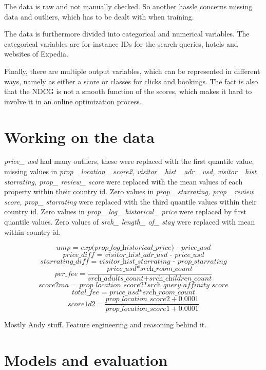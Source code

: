 \documentclass{llncs}
\begin{document}
The data is raw and not manually checked. So another hassle concerns missing data and outliers, which has to be dealt with when training. 

The data is furthermore divided into categorical and numerical variables. The categorical variables are for instance IDs for the search queries, hotels and websites of Expedia.  

Finally, there are multiple output variables, which can be represented in different ways, namely as either a score or classes for clicks and bookings. The fact is also that the NDCG is not a smooth function of the scores, which makes it hard to involve it in an online optimization process.            

\section{Working on the data}
\textit{price\_ usd} had many outliers, these were replaced with the first quantile value, missing values in \textit{prop\_ location\_ score2, visitor\_ hist\_ adr\_ usd, visitor\_ hist\_ starrating, prop\_ review\_ score} were replaced with the mean values of each property within their country id. Zero values in \textit{prop\_ starrating, prop\_ review\_ score, prop\_ starrating} were replaced with the third quantile values within their country id. Zero values in \textit{prop\_ log\_ historical\_ price} were replaced by first quantile values. Zero values of \textit{srch\_ length\_ of\_ stay} were replaced with mean within country id.

\[\textit{ump = exp(prop\_ log\_ historical\_ price) - price\_ usd}\]
\[\textit{price\_ diff = visitor\_ hist\_ adr\_ usd - price\_ usd}\]
\[\textit{starrating\_ diff = visitor\_ hist\_ starrating - prop\_ starrating}\]
\[\textit{per\_ fee} = \frac{\textit{price\_ usd*srch\_ room\_ count}}{\textit{srch\_ adults\_ count+srch\_ children\_ count}}\]
\[\textit{score2ma = prop\_ location\_ score2*srch\_ query\_ affinity\_ score}\]
\[\textit{total\_ fee = price\_ usd*srch\_ room\_ count}\]
\[ \textit{score1d2} = \frac{\textit{prop\_ location\_ score2} + 0.0001}{\textit{prop\_ location\_ score1} + 0.0001}\]

Mostly Andy stuff.
Feature engineering and reasoning behind it.


\section{Models and evaluation}
\end{document}
